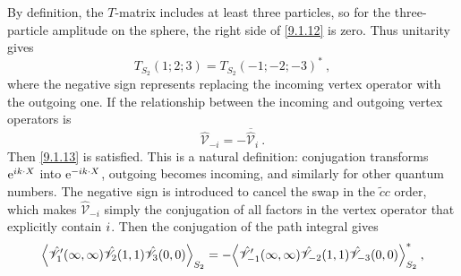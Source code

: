 By definition, the $T$-matrix includes at least three particles, so for the three-particle amplitude on the sphere, the right side of \eqref{9.1.12} is zero.
Thus unitarity gives
\begin{equation}
	T_{S_{2}}(1; 2; 3) = T_{S_{2}}(-1; -2; -3)^{*} \:, \label{9.1.13}
\end{equation}
where the negative sign represents replacing the incoming vertex operator with the outgoing one. If the relationship between the incoming and outgoing vertex operators is
\begin{equation}
	\hat{\mathscr{V}}_{-i}=-\overline{\hat{\mathscr{V}}}_{i} \:. \label{9.1.14}
\end{equation}
Then \eqref{9.1.13} is satisfied.
This is a natural definition: conjugation transforms $\mathrm{e}^{i k \cdot X}$ into $\mathrm{e}^{-i k \cdot X}$, outgoing becomes incoming, and similarly for other quantum numbers. 
The negative sign is introduced to cancel the swap in the $\tilde{c} c$ order, which makes $\hat{\mathscr{V}}_{-i}$ simply the conjugation of all factors in the vertex operator that explicitly contain $i$.
Then the conjugation of the path integral gives
\begin{equation}
	\Bigl\langle \hat{\mathscr{V}}_{1}^{\prime}(\infty,\infty) \hat{\mathscr{V}}_{2}(1,1) \hat{\mathscr{V}}_{3}(0,0)\Bigr\rangle_{S_{2}}=-\Bigl\langle\hat{\mathscr{V}}_{-1}^{\prime}(\infty,\infty) \hat{\mathscr{V}}_{-2}(1,1) 
	\hat{\mathscr{V}}_{-3}(0,0)\Bigr\rangle_{S_{2}}^{*} \:, \label{9.1.15}
\end{equation}
